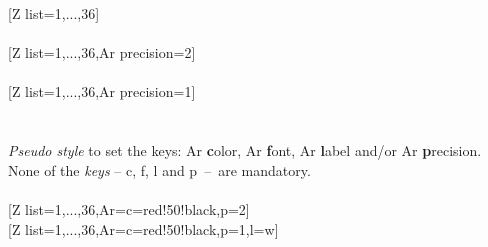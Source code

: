 \vfill\newpage%
[Z list={1,...,36}]%
\\ [5pt]\makebox[\linewidth][c]{\scalebox{.6}{\pgfPT[Z list={1,...,36}]}}%
\\ [5pt][Z list={1,...,36},Ar precision=2]%
\\ [5pt]\makebox[\linewidth][c]{\scalebox{.6}{\pgfPT[Z list={1,...,36},Ar precision=2]}}%
\\ [5pt][Z list={1,...,36},Ar precision=1]%
\\ [5pt]\makebox[\linewidth][c]{\scalebox{.6}{\pgfPT[Z list={1,...,36},Ar precision=1]}}%
\\ [0pt]\pgfPTendoption%
\vfill%
%
{\ \\ [-3pt]\textit{Pseudo style} to set the keys: Ar \textbf{c}olor, Ar \textbf{f}ont, Ar \textbf{l}abel and/or Ar \textbf{p}recision.
None of the \textit{keys} -- c, f, l and \mbox{p -- are} mandatory.
\\ [3pt]%
}%
\\ [5pt][Z list={1,...,36},Ar={c=red!50!black,p=2}]%
\\ [5pt]\makebox[\linewidth][c]{\scalebox{.6}{\pgfPT[Z list={1,...,36},Ar={c=red!50!black,p=2}]}}%
\vfill\newpage%
[Z list={1,...,36},Ar={c=red!50!black,p=1,l=w}]%
\\ [5pt]\makebox[\linewidth][c]{\scalebox{.6}{\pgfPT[Z list={1,...,36},Ar={c=red!50!black,p=1,l=w}]}}%
\\ [0pt]\pgfPTendstyle%
\endinput
